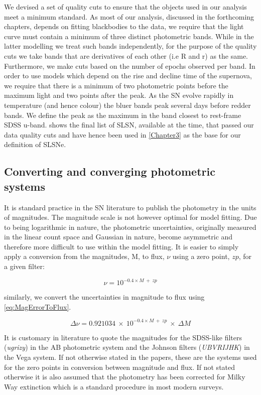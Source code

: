 We devised a set of quality cuts to ensure that the objects used in our analysis meet a minimum standard. As most of our analysis, discussed in the forthcoming chapters, depends on fitting blackbodies to the data, we require that the light curve must contain a minimum of three distinct photometric bands. While in the latter modelling we treat such bands independently, for the purpose of the quality cuts we take bands that are derivatives of each other (i.e R and r) as the same. Furthermore, we make cuts based on the number of epochs observed per band. In order to use models which depend on the rise and decline time of the supernova, we require that there is a minimum of two photometric points before the maximum light and two points after the peak. As the SN evolve rapidly in temperature (and hence colour) the bluer bands peak several days before redder bands. We define the peak as the maximum in the band closest to rest-frame SDSS u-band.  shows the final list of SLSN, available at the time, that passed our data quality cuts and have hence been used in \cref{Chapter3} as the base for our definition of SLSNe.

\subsection{Converting and converging photometric systems}
It is standard practice in the SN literature to publish the photometry in the units of magnitudes. The magnitude scale is not however optimal for model fitting. Due to being logarithmic in nature, the photometric uncertainties, originally measured in the linear count space and Gaussian in nature, become asymmetric and therefore more difficult to use within the model fitting. It is easier to simply apply a conversion from the magnitudes, M, to flux, $\nu$ using a zero point, $zp$, for a given filter:

\begin{equation}
\label{eq:MagToFlux}
\nu = 10^{-0.4 \times M~+~zp}
\end{equation}

similarly, we convert the uncertainties in magnitude to flux using \eqref{eq:MagErrorToFlux}.

\begin{equation}
\label{eq:MagErrorToFlux}
\Delta \nu = 0.921034~\times~10^{-0.4 \times M~+~zp}~\times~\Delta M
\end{equation}

It is customary in literature to quote the magnitudes for the SDSS-like filters (\textit{ugrizy}) in the AB photometric system and the Johnson filters (\textit{UBVRIJHK}) in the Vega system. If not otherwise stated in the papers, these are the systems used for the zero points in conversion between magnitude and flux. If not stated otherwise it is also assumed that the photometry has been corrected for Milky Way extinction which is a standard procedure in most modern surveys.

